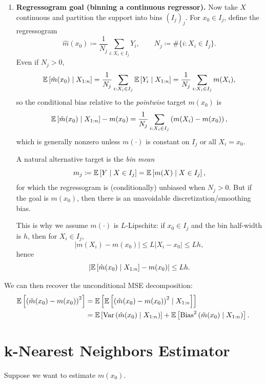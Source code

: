 \begin{remark}
\begin{enumerate}[label=(\arabic*)]
		\item \textbf{Regressogram goal (binning a continuous regressor).}
		Now take $X$ continuous and partition the support into bins $(I_j)_j$. For $x_0\in I_j$, define the regressogram
		\[
			\hat{m}(x_0) \coloneqq \frac{1}{N_j}\sum\limits_{i: X_i\in I_j}^{} Y_i,
			\qquad
			N_j \coloneqq \#\{i: X_i\in I_j\}.
		\]
		Even if $N_j>0$,
		\[
			\mathbb{E}\left[\hat{m}(x_0)\mid X_{1:n}\right]
			= \frac{1}{N_j}\sum\limits_{i:X_i\in I_j}^{} \mathbb{E}\left[Y_i\mid X_{1:n}\right]
			= \frac{1}{N_j}\sum\limits_{i:X_i\in I_j}^{} m(X_i),
		\]
		so the conditional bias relative to the \emph{pointwise} target $m(x_0)$ is
		\[
			\mathbb{E}\left[\hat{m}(x_0)\mid X_{1:n}\right]-m(x_0)
			= \frac{1}{N_j}\sum\limits_{i:X_i\in I_j}^{} \left(m(X_i)-m(x_0)\right),
		\]
		which is generally nonzero unless $m(\cdot)$ is constant on $I_j$ or all $X_i = x_0$.

		A natural alternative target is the \emph{bin mean}
		\[
			m_j \coloneqq \mathbb{E}\left[Y\mid X\in I_j\right] = \mathbb{E}\left[m(X)\mid X\in I_j\right],
		\]
		for which the regressogram is (conditionally) unbiased when $N_j>0$. But if the goal is $m(x_0)$, then there is an unavoidable discretization/smoothing bias.

		This is why we assume $m(\cdot)$ is $L$-Lipschitz: if $x_0\in I_j$ and the bin half-width is $h$, then for $X_i\in I_j$,
		\[
			\left|m(X_i)-m(x_0)\right|\le L\left|X_i-x_0\right|\le Lh,
		\]
		hence
		\[
			\left|\mathbb{E}\left[\hat{m}(x_0)\mid X_{1:n}\right]-m(x_0)\right|\le Lh.
		\]
	\end{enumerate}

	We can then recover the unconditional MSE decomposition:
	\begin{align*}
		\mathbb{E}\left[\left( \hat{m}(x_0) - m(x_0) \right)^2\right] &= \mathbb{E}\left[\mathbb{E}\left[\left( \hat{m}(x_0) - m(x_0) \right)^2 \mid X_{1:n}\right]  \right] \\
															  &= \mathbb{E}\left[\operatorname{Var}\left(\hat{m}(x_0) \mid X_{1:n}\right)\right] + \mathbb{E}\left[\operatorname{Bias}^2\left(\hat{m}(x_0) \mid X_{1:n}\right)\right] 
	.\end{align*}
\end{remark}

\section{k-Nearest Neighbors Estimator}



Suppose we want to estimate $m(x_0)$.

